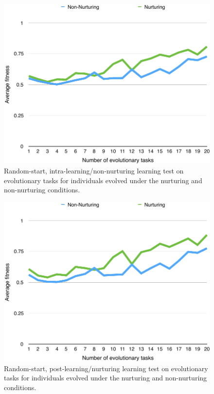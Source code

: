 \documentclass[master]{outhesis}
\begin{document}
\begin{figure}[H]
	\centering
	\includegraphics{NonNurturingLearningTestPlot.pdf}
	\caption{Random-start, intra-learning/non-nurturing learning test on evolutionary tasks for individuals evolved under the nurturing and non-nurturing conditions.}
\end{figure}

\begin{figure}[H]
	\centering
	\includegraphics{NurturingLearningTestPlot.pdf}
	\caption{Random-start, post-learning/nurturing learning test on evolutionary tasks for individuals evolved under the nurturing and non-nurturing conditions.}
\end{figure}
\end{document}
